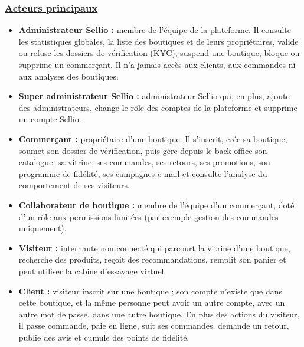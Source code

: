 \subsubsection*{\underline{\textbf{Acteurs principaux}}}
\begin{itemize}[label=]
\item \textbf{Administrateur Sellio :} membre de l'équipe de la plateforme. Il consulte les statistiques globales, la liste des boutiques et de leurs propriétaires, valide ou refuse les dossiers de vérification (KYC), suspend une boutique, bloque ou supprime un commerçant. Il n'a jamais accès aux clients, aux commandes ni aux analyses des boutiques.
\item \textbf{Super administrateur Sellio :} administrateur Sellio qui, en plus, ajoute des administrateurs, change le rôle des comptes de la plateforme et supprime un compte Sellio.
\item \textbf{Commerçant :} propriétaire d'une boutique. Il s'inscrit, crée sa boutique, soumet son dossier de vérification, puis gère depuis le back-office son catalogue, sa vitrine, ses commandes, ses retours, ses promotions, son programme de fidélité, ses campagnes e-mail et consulte l'analyse du comportement de ses visiteurs.
\item \textbf{Collaborateur de boutique :} membre de l'équipe d'un commerçant, doté d'un rôle aux permissions limitées (par exemple gestion des commandes uniquement).
\item \textbf{Visiteur :} internaute non connecté qui parcourt la vitrine d'une boutique, recherche des produits, reçoit des recommandations, remplit son panier et peut utiliser la cabine d'essayage virtuel.
\item \textbf{Client :} visiteur inscrit sur une boutique ; son compte n'existe que dans cette boutique, et la même personne peut avoir un autre compte, avec un autre mot de passe, dans une autre boutique. En plus des actions du visiteur, il passe commande, paie en ligne, suit ses commandes, demande un retour, publie des avis et cumule des points de fidélité.
\end{itemize}
